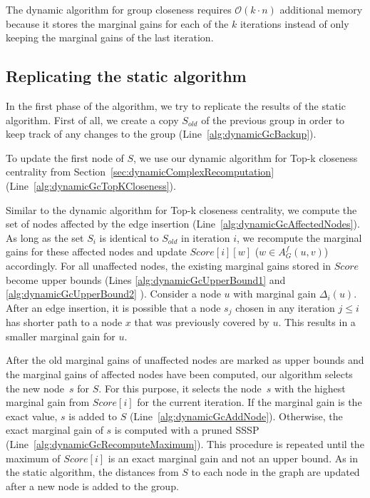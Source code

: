 The dynamic algorithm for group closeness requires $\mathcal{O}(k \cdot n)$ additional memory because it stores the marginal gains for each of the $k$ iterations instead of only keeping the marginal gains of the last iteration.

\subsection{Replicating the static algorithm}
In the first phase of the algorithm, we try to replicate the results of the static algorithm. First of all, we create a copy $S_{old}$ of the previous group in order to keep track of any changes to the group (Line~\ref{alg:dynamicGcBackup}).

To update the first node of $S$, we use our dynamic algorithm for Top-k closeness centrality from Section~\ref{sec:dynamicComplexRecomputation} (Line~\ref{alg:dynamicGcTopKCloseness}). 

Similar to the dynamic algorithm for Top-k closeness centrality, we compute the set of nodes affected by the edge insertion (Line~\ref{alg:dynamicGcAffectedNodes}). As long as the set $S_i$ is identical to $S_{old}$ in iteration $i$, we recompute the marginal gains for these affected nodes and update $Score[i][w]$ ($w \in A_G^f(u, v)$) accordingly. For all unaffected nodes, the existing marginal gains stored in $Score$ become upper bounds (Lines \ref{alg:dynamicGcUpperBound1} and \ref{alg:dynamicGcUpperBound2} ). Consider a node $u$ with marginal gain $\Delta_i(u)$. After an edge insertion, it is possible that a node $s_j$ chosen in any iteration $j \leq i$ has shorter path to a node $x$ that was previously covered by $u$. This results in a smaller marginal gain for $u$.

After the old marginal gains of unaffected nodes are marked as upper bounds and the marginal gains of affected nodes have been computed, our algorithm selects the new node~$s$ for $S$. For this purpose, it selects the node~$s$ with the highest marginal gain from $Score[i]$ for the current iteration. If the marginal gain is the exact value, $s$ is added to $S$ (Line~\ref{alg:dynamicGcAddNode}). Otherwise, the exact marginal gain of $s$ is computed with a pruned SSSP (Line~\ref{alg:dynamicGcRecomputeMaximum}). This procedure is repeated until the maximum of $Score[i]$ is an exact marginal gain and not an upper bound. As in the static algorithm, the distances from $S$ to each node in the graph are updated after a new node is added to the group.


